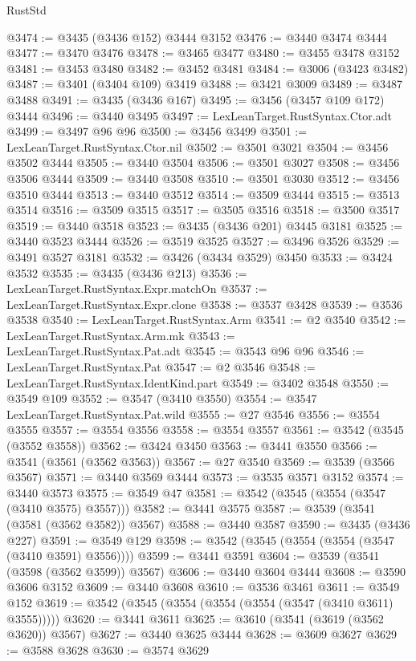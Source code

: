 \begin{lexlean}{RustStd}
\begin{coremodule}
@3474 := @3435 (@3436 @152) @3444 @3152
@3476 := @3440 @3474 @3444
@3477 := @3470 @3476
@3478 := @3465 @3477
@3480 := @3455 @3478 @3152
@3481 := @3453 @3480
@3482 := @3452 @3481
@3484 := @3006 (@3423 @3482)
@3487 := @3401 (@3404 @109) @3419
@3488 := @3421 @3009
@3489 := @3487 @3488
@3491 := @3435 (@3436 @167)
@3495 := @3456 (@3457 @109 @172) @3444
@3496 := @3440 @3495
@3497 := LexLeanTarget.RustSyntax.Ctor.adt
@3499 := @3497 @96 @96
@3500 := @3456 @3499
@3501 := LexLeanTarget.RustSyntax.Ctor.nil
@3502 := @3501 @3021
@3504 := @3456 @3502 @3444
@3505 := @3440 @3504
@3506 := @3501 @3027
@3508 := @3456 @3506 @3444
@3509 := @3440 @3508
@3510 := @3501 @3030
@3512 := @3456 @3510 @3444
@3513 := @3440 @3512
@3514 := @3509 @3444
@3515 := @3513 @3514
@3516 := @3509 @3515
@3517 := @3505 @3516
@3518 := @3500 @3517
@3519 := @3440 @3518
@3523 := @3435 (@3436 @201) @3445 @3181
@3525 := @3440 @3523 @3444
@3526 := @3519 @3525
@3527 := @3496 @3526
@3529 := @3491 @3527 @3181
@3532 := @3426 (@3434 @3529) @3450
@3533 := @3424 @3532
@3535 := @3435 (@3436 @213)
@3536 := LexLeanTarget.RustSyntax.Expr.matchOn
@3537 := LexLeanTarget.RustSyntax.Expr.clone
@3538 := @3537 @3428
@3539 := @3536 @3538
@3540 := LexLeanTarget.RustSyntax.Arm
@3541 := @2 @3540
@3542 := LexLeanTarget.RustSyntax.Arm.mk
@3543 := LexLeanTarget.RustSyntax.Pat.adt
@3545 := @3543 @96 @96
@3546 := LexLeanTarget.RustSyntax.Pat
@3547 := @2 @3546
@3548 := LexLeanTarget.RustSyntax.IdentKind.part
@3549 := @3402 @3548
@3550 := @3549 @109
@3552 := @3547 (@3410 @3550)
@3554 := @3547 LexLeanTarget.RustSyntax.Pat.wild
@3555 := @27 @3546
@3556 := @3554 @3555
@3557 := @3554 @3556
@3558 := @3554 @3557
@3561 := @3542 (@3545 (@3552 @3558))
@3562 := @3424 @3450
@3563 := @3441 @3550
@3566 := @3541 (@3561 (@3562 @3563))
@3567 := @27 @3540
@3569 := @3539 (@3566 @3567)
@3571 := @3440 @3569 @3444
@3573 := @3535 @3571 @3152
@3574 := @3440 @3573
@3575 := @3549 @47
@3581 := @3542 (@3545 (@3554 (@3547 (@3410 @3575) @3557)))
@3582 := @3441 @3575
@3587 := @3539 (@3541 (@3581 (@3562 @3582)) @3567)
@3588 := @3440 @3587
@3590 := @3435 (@3436 @227)
@3591 := @3549 @129
@3598 := @3542 (@3545 (@3554 (@3554 (@3547 (@3410 @3591) @3556))))
@3599 := @3441 @3591
@3604 := @3539 (@3541 (@3598 (@3562 @3599)) @3567)
@3606 := @3440 @3604 @3444
@3608 := @3590 @3606 @3152
@3609 := @3440 @3608
@3610 := @3536 @3461
@3611 := @3549 @152
@3619 := @3542 (@3545 (@3554 (@3554 (@3554 (@3547 (@3410 @3611) @3555)))))
@3620 := @3441 @3611
@3625 := @3610 (@3541 (@3619 (@3562 @3620)) @3567)
@3627 := @3440 @3625 @3444
@3628 := @3609 @3627
@3629 := @3588 @3628
@3630 := @3574 @3629

\end{coremodule}
\end{lexlean}
